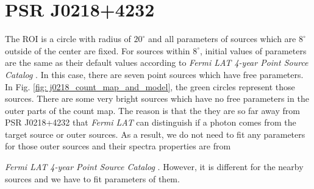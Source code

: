 \documentclass[12pt]{report}
\newcommand{\mycaption}[1]{\protect \caption{#1}}
\newcommand{\fgl}[0]{
  \textit{Fermi LAT 4-year Point Source Catalog}
}
\begin{document}
          \begin{table}[!ht]
            \centering
            \mycaption{Fit results with data from year 2009 to year 2018. The physical 
              meanings of $\Gamma$ and $E_c$ are the same as Table 
              \ref{table: previous_result_comparison}.}
            \label{table: 2018_fit_data}
          \end{table}
          \vspace{1cm}            

        \section{PSR J0218+4232}
          The ROI is a circle with radius of $20^\circ$ and all parameters of sources which 
          are $8^\circ$ outside of the center are fixed. For sources within $8^\circ$, initial
          values of parameters are the same as their default values according to \fgl.
          In this case, there are seven point sources which have free parameters. In Fig.
          \ref{fig: j0218_count_map_and_model}, the green circles represent those sources.
          There are some very bright sources which have no free parameters
          in the outer parts of the count map. The reason is that the they are so far away 
          from PSR J0218+4232 that \textit{Fermi LAT} can distinguish if a photon comes 
          from the target source or outer sources. As a result, we do not need to fit 
          any parameters for those outer sources and their spectra properties are from 
          \fgl. However, it is different for the nearby sources and we have to fit parameters
          of them.
          
\end{document}
